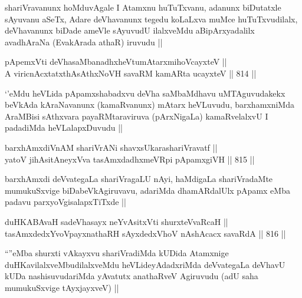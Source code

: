 \begin{artha}
shariVravanunx hoMduvAgale I Atamxnu huTuTxvanu, adanunx biDutatxle sAyuvanu aSeTx, Adare deVhavanunx tegedu koLaLxva muMce huTuTxvudilalx, deVhavanunx biDade ameVle sAyuvudU ilalxveMdu aBipArxyadalilx avadhAraNa (EvakArada athaR) iruvudu ||
\end{artha}


\begin{shl}
pApemxVti deVhasaMbanadhxheVtumAtarxmihoVcayxteV || \\
A viricnAcxtatxthA\s \s  sAthxNoVH savaRM kamARta ucayxteV ||  814 ||  
\end{shl}

\begin{artha}
`\stext'eMdu heVLida pApamxshabadxvu deVha saMbaMdhavu uMTAguvudakekx beVkAda kAraNavanunx (kamaRvanunx) mAtarx heVLuvudu, barxhamxniMda AraMBisi sAthxvara payaRMtaraviruva (pArxNigaLa) kamaRvelalxvU I padadiMda heVLalapxDuvudu ||
\end{artha}


\begin{shl}
barxhAmxdiVnAM shariVrANi shavxsUkarashariVravatf || \\
yatoV jihAsitAneyxVva tasAmxdadhxmeVR\s pi pApamxgiVH ||  815 ||  
\end{shl}

\begin{artha}
barxhAmxdi deVvategaLa shariVragaLU nAyi, haMdigaLa shariVradaMte mumukuSxvige biDabeVkAgiruvavu, adariMda dhamARdalUlx pApamx eMba padavu parxyoVgisalapxTiTxde ||
\end{artha}


\begin{shl}
duHKABAvaH sadeVhasayx neYvAsitxVti shurxteVvaRcaH || \\
tasAmxdedxYvoV\s payxnathaRH sAyxdedxVhoV nAshAcacx savaRdA ||  816 ||  
\end{shl}

\begin{artha}
``\stext''eMba shurxti vAkayxvu shariVradiMda kUDida Atamxnige duHKavilalxveMbudilalxveMdu heVLideyAdadxriMda deVvategaLa deVhavU kUDa nashisuvudariMda yAvatutx anathaRveV Agiruvudu (adU saha mumukuSxvige tAyxjayxveV) ||
\end{artha}

